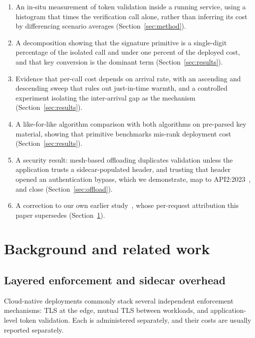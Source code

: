 \documentclass[pdflatex,sn-basic,twocolumn]{sn-jnl}
\begin{document}
\begin{enumerate}
\item An in-situ measurement of token validation inside a running service,
      using a histogram that times the verification call alone, rather than
      inferring its cost by differencing scenario averages
      (Section~\ref{sec:method}).
\item A decomposition showing that the signature primitive is a single-digit
      percentage of the isolated call and under one percent of the deployed
      cost, and that key conversion is the dominant term
      (Section~\ref{sec:results}).
\item Evidence that per-call cost depends on arrival rate, with an ascending
      and descending sweep that rules out just-in-time warmth, and a controlled
      experiment isolating the inter-arrival gap as the mechanism
      (Section~\ref{sec:results}).
\item A like-for-like algorithm comparison with both algorithms on pre-parsed
      key material, showing that primitive benchmarks mis-rank deployment cost
      (Section~\ref{sec:results}).
\item A security result: mesh-based offloading duplicates validation unless the
      application trusts a sidecar-populated header, and trusting that header
      opened an authentication bypass, which we demonstrate, map to
      API2:2023~\cite{owasp2023api}, and close (Section~\ref{sec:offload}).
\item A correction to our own earlier study~\cite{sikdar2026quantifying}, whose
      per-request attribution this paper supersedes
      (Section~\ref{sec:related}).
\end{enumerate}

\section{Background and related work}\label{sec:related}

\subsection{Layered enforcement and sidecar overhead}

Cloud-native deployments commonly stack several independent enforcement
mechanisms: TLS at the edge, mutual TLS between workloads, and application-level
token validation. Each is administered separately, and their costs are usually
reported separately.
\end{document}
